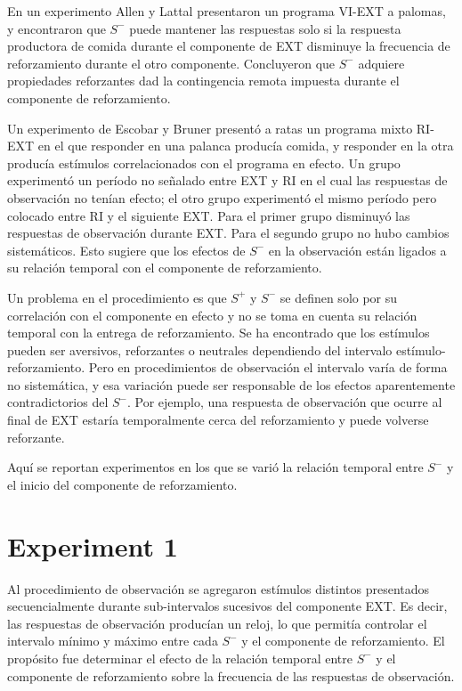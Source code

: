 \documentclass[a4paper,12pt]{article}
\begin{document}
En un experimento Allen y Lattal presentaron un programa VI-EXT a palomas, y encontraron que $S^{-}$ puede mantener las respuestas solo si la respuesta productora de comida durante el componente de EXT disminuye la frecuencia de reforzamiento durante el otro componente.
Concluyeron que $S^{-}$ adquiere propiedades reforzantes dad la contingencia remota impuesta durante el componente de reforzamiento.

Un experimento de Escobar y Bruner presentó a ratas un programa mixto RI-EXT en el que responder en una palanca producía comida, y responder en la otra producía estímulos correlacionados con el programa en efecto.
Un grupo experimentó un período no señalado entre EXT y RI en el cual las respuestas de observación no tenían efecto; el otro grupo experimentó el mismo período pero colocado entre RI y el siguiente EXT.
Para el primer grupo disminuyó las respuestas de observación durante EXT.
Para el segundo grupo no hubo cambios sistemáticos.
Esto sugiere que los efectos de $S^{-}$ en la observación están ligados a su relación temporal con el componente de reforzamiento.

Un problema en el procedimiento es que $S^{+}$ y $S^{-}$ se definen solo por su correlación con el componente en efecto y no se toma en cuenta su relación temporal con la entrega de reforzamiento.
Se ha encontrado que los estímulos pueden ser aversivos, reforzantes o neutrales dependiendo del intervalo estímulo-reforzamiento.
Pero en procedimientos de observación el intervalo varía de forma no sistemática, y esa variación puede ser responsable de los efectos aparentemente contradictorios del $S^{-}$.
Por ejemplo, una respuesta de observación que ocurre al final de EXT estaría temporalmente cerca del reforzamiento y puede volverse reforzante.

Aquí se reportan experimentos en los que se varió la relación temporal entre $S^{-}$ y el inicio del componente de reforzamiento.

\section{Experiment 1}

Al procedimiento de observación se agregaron estímulos distintos presentados secuencialmente durante sub-intervalos sucesivos del componente EXT.
Es decir, las respuestas de observación producían un reloj, lo que permitía controlar el intervalo mínimo y máximo entre cada $S^{-}$ y el componente de reforzamiento.
El propósito fue determinar el efecto de la relación temporal entre $S^{-}$ y el componente de reforzamiento sobre la frecuencia de las respuestas de observación.
\end{document}
